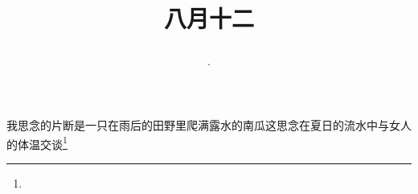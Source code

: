 \title{\date[d=14,m=9,y=2024][year:cn-y,年,month:cn,day:cn,日,·,weekday]·八月十二 }
我思念的片断是一只在雨后的田野里爬满露水的南瓜这思念在夏日的流水中与女人的体温交谈\footnote{ }


